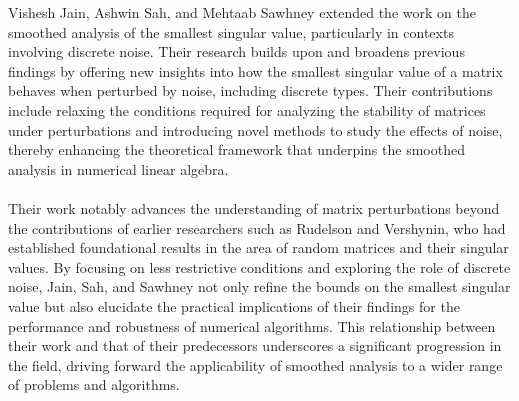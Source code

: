 Vishesh Jain, Ashwin Sah, and Mehtaab Sawhney extended the work on the smoothed analysis of the smallest singular value, particularly in contexts involving discrete noise. Their research builds upon and broadens previous findings by offering new insights into how the smallest singular value of a matrix behaves when perturbed by noise, including discrete types. Their contributions include relaxing the conditions required for analyzing the stability of matrices under perturbations and introducing novel methods to study the effects of noise, thereby enhancing the theoretical framework that underpins the smoothed analysis in numerical linear algebra.\\\\
Their work notably advances the understanding of matrix perturbations beyond the contributions of earlier researchers such as Rudelson and Vershynin, who had established foundational results in the area of random matrices and their singular values. By focusing on less restrictive conditions and exploring the role of discrete noise, Jain, Sah, and Sawhney not only refine the bounds on the smallest singular value but also elucidate the practical implications of their findings for the performance and robustness of numerical algorithms. This relationship between their work and that of their predecessors underscores a significant progression in the field, driving forward the applicability of smoothed analysis to a wider range of problems and algorithms.\\\\
